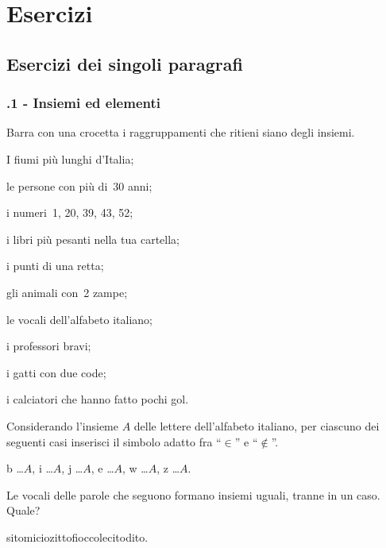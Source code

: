 \section{Esercizi}
\subsection{Esercizi dei singoli paragrafi}
\subsubsection*{\thechapter.1 - Insiemi ed elementi}

\begin{esercizio}
 \label{ese:\thechapter.1}
 Barra con una crocetta i raggruppamenti che ritieni siano degli insiemi.
 \begin{multicols}{2}
 \begin{enumeratea}
\item I fiumi più lunghi d'Italia;
\item le persone con più di~30 anni;
\item i numeri~1, 20, 39, 43, 52;
\item i libri più pesanti nella tua cartella;
\item i punti di una retta;
\item gli animali con~2 zampe;
\item le vocali dell'alfabeto italiano;
\item i professori bravi;
\item i gatti con due code;
\item i calciatori che hanno fatto pochi gol.
\end{enumeratea}
\end{multicols}
\end{esercizio}

\begin{esercizio}
 \label{ese:\thechapter.2}
Considerando l'insieme $A$ delle lettere dell'alfabeto italiano, per ciascuno dei seguenti casi inserisci il simbolo adatto fra ``$\in$'' e ``$\notin$''.

b \ldots $A$, i \ldots $A$, j \ldots $A$, e \ldots $A$, w \ldots $A$, z \ldots $A$.
\end{esercizio}

\begin{esercizio}
\label{ese:\thechapter.3}
Le vocali delle parole che seguono formano insiemi uguali, tranne in un caso. Quale?
\begin{center}
 \boxA\quad sito\quad\boxB\quad micio\quad\boxC\quad zitto\quad\boxD\quad fiocco\quad\boxE\quad lecito\quad\boxF\quad dito.
\end{center}
\end{esercizio}

